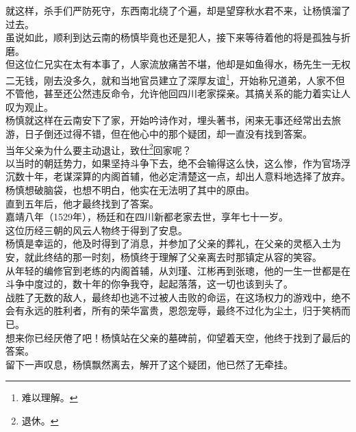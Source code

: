 \begin{multicols}{\theparacolNo}
就这样，杀手们严防死守，东西南北绕了个遍，却是望穿秋水君不来，让杨慎溜了过去。\\

虽说如此，顺利到达云南的杨慎毕竟也还是犯人，接下来等待着他的将是孤独与折磨。\\

但这位仁兄实在太有本事了，人家流放痛苦不堪，他却是如鱼得水，杨先生一无权二无钱，刚去没多久，就和当地官员建立了深厚友谊\footnote{难以理解。}，开始称兄道弟，人家不但不管他，甚至还公然违反命令，允许他回四川老家探亲。其搞关系的能力着实让人叹为观止。\\

杨慎就这样在云南安下了家，开始吟诗作对，埋头著书，闲来无事还经常出去旅游，日子倒还过得不错，但在他心中的那个疑团，却一直没有找到答案。\\

当年父亲为什么要主动退让，致仕\footnote{退休。}回家呢？\\

以当时的朝廷势力，如果坚持斗争下去，绝不会输得这么快，这么惨，作为官场浮沉数十年，老谋深算的内阁首辅，他必定清楚这一点，却出人意料地选择了放弃。\\

杨慎想破脑袋，也想不明白，他实在无法明了其中的原由。\\

直到五年后，他才最终找到了答案。\\

嘉靖八年（1529年），杨廷和在四川新都老家去世，享年七十一岁。\\

这位历经三朝的风云人物终于得到了安息。\\

杨慎是幸运的，他及时得到了消息，并参加了父亲的葬礼，在父亲的灵柩入土为安，就此终结的那一时刻，杨慎终于理解了父亲离去时那镇定从容的笑容。\\

从年轻的编修官到老练的内阁首辅，从刘瑾、江彬再到张璁，他的一生一世都是在斗争中度过的，数十年的你争我夺，起起落落，这一切也该到头了。\\

战胜了无数的敌人，最终却也逃不过被人击败的命运，在这场权力的游戏中，绝不会有永远的胜利者，所有的荣华富贵，恩怨宠辱，最终不过化为尘土，归于笑柄而已。\\

想来你已经厌倦了吧！杨慎站在父亲的墓碑前，仰望着天空，他终于找到了最后的答案。\\

留下一声叹息，杨慎飘然离去，解开了这个疑团，他已然了无牵挂。\\


\end{multicols}
